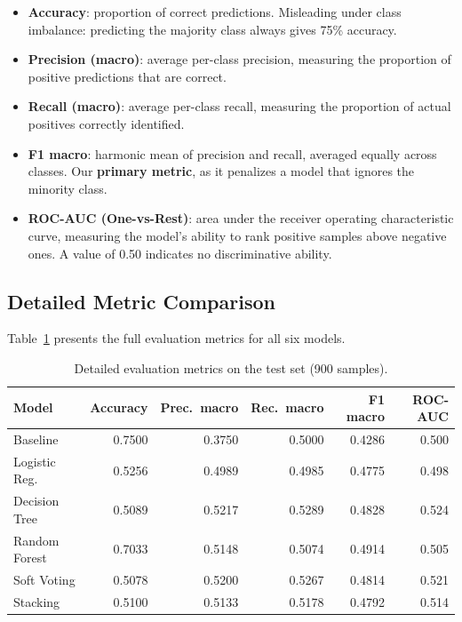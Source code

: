 \documentclass[a4paper,12pt]{article}
\begin{document}
\begin{itemize}[leftmargin=2cm]
    \item \textbf{Accuracy}: proportion of correct predictions. Misleading under class imbalance: predicting the majority class always gives 75\% accuracy.
    \item \textbf{Precision (macro)}: average per-class precision, measuring the proportion of positive predictions that are correct.
    \item \textbf{Recall (macro)}: average per-class recall, measuring the proportion of actual positives correctly identified.
    \item \textbf{F1 macro}: harmonic mean of precision and recall, averaged equally across classes. Our \textbf{primary metric}, as it penalizes a model that ignores the minority class.
    \item \textbf{ROC-AUC (One-vs-Rest)}: area under the receiver operating characteristic curve, measuring the model's ability to rank positive samples above negative ones. A value of 0.50 indicates no discriminative ability.
\end{itemize}

\subsection{Detailed Metric Comparison}

Table~\ref{tab:detailed_metrics} presents the full evaluation metrics for all six models.

\begin{table}[H]
\centering
\caption{Detailed evaluation metrics on the test set (900 samples).}
\label{tab:detailed_metrics}
\begin{tabular}{lrrrrr}
\toprule
\textbf{Model} & \textbf{Accuracy} & \textbf{Prec.\ macro} & \textbf{Rec.\ macro} & \textbf{F1 macro} & \textbf{ROC-AUC} \\
\midrule
Baseline          & 0.7500 & 0.3750 & 0.5000 & 0.4286 & 0.500 \\
Logistic Reg.     & 0.5256 & 0.4989 & 0.4985 & 0.4775 & 0.498 \\
Decision Tree     & 0.5089 & 0.5217 & 0.5289 & 0.4828 & 0.524 \\
Random Forest     & 0.7033 & 0.5148 & 0.5074 & 0.4914 & 0.505 \\
Soft Voting       & 0.5078 & 0.5200 & 0.5267 & 0.4814 & 0.521 \\
Stacking          & 0.5100 & 0.5133 & 0.5178 & 0.4792 & 0.514 \\
\bottomrule
\end{tabular}
\end{table}
\end{document}
